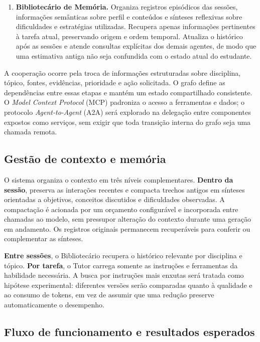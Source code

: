 \documentclass[12pt]{article}
\begin{document}
\begin{enumerate}
    \item \textbf{Bibliotecário de Memória.} Organiza registros episódicos das sessões, informações semânticas sobre perfil e conteúdos e sínteses reflexivas sobre dificuldades e estratégias utilizadas. Recupera apenas informações pertinentes à tarefa atual, preservando origem e ordem temporal. Atualiza o histórico após as sessões e atende consultas explícitas dos demais agentes, de modo que uma estimativa antiga não seja confundida com o estado atual do estudante.
\end{enumerate}

A cooperação ocorre pela troca de informações estruturadas sobre disciplina, tópico, fontes, evidências, prioridade e ação solicitada. O grafo define as dependências entre essas etapas e mantém um estado compartilhado consistente. O \textit{Model Context Protocol} (MCP) padroniza o acesso a ferramentas e dados; o protocolo \textit{Agent-to-Agent} (A2A) será explorado na delegação entre componentes expostos como serviços, sem exigir que toda transição interna do grafo seja uma chamada remota.

\subsection{Gestão de contexto e memória}

O sistema organiza o contexto em três níveis complementares. \textbf{Dentro da sessão}, preserva as interações recentes e compacta trechos antigos em sínteses orientadas a objetivos, conceitos discutidos e dificuldades observadas. A compactação é acionada por um orçamento configurável e incorporada entre chamadas ao modelo, sem pressupor alteração do contexto durante uma geração em andamento. Os registros originais permanecem recuperáveis para conferir ou complementar as sínteses.

\textbf{Entre sessões}, o Bibliotecário recupera o histórico relevante por disciplina e tópico. \textbf{Por tarefa}, o Tutor carrega somente as instruções e ferramentas da habilidade necessária. A busca por instruções mais enxutas será tratada como hipótese experimental: diferentes versões serão comparadas quanto à qualidade e ao consumo de tokens, em vez de assumir que uma redução preserve automaticamente o desempenho.

\subsection{Fluxo de funcionamento e resultados esperados}
\end{document}
